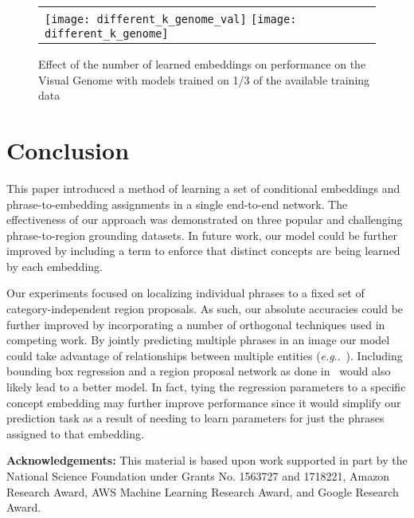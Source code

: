 \documentclass[runningheads]{llncs}
\makeatletter
\DeclareRobustCommand\onedot{\futurelet\@let@token\@onedot}
\def\@onedot{\ifx\@let@token.\else.\null\fi\xspace}
\def\eg{\emph{e.g}\onedot} \def\Eg{\emph{E.g}\onedot}
\def\etal{\emph{et al}\onedot}
\makeatother
\begin{document}
\begin{figure}[t]
\centering
\begin{tabular}{lr}
\texttt{[image: different\_k\_genome\_val]}
\texttt{[image: different\_k\_genome]}
\end{tabular}
\caption{Effect of the number of learned embeddings on performance on the Visual Genome with models trained on 1/3 of the available training data}
\label{fig:choice_of_K_genome}
\end{figure}%
\section{Conclusion}

This paper introduced a method of learning a set of conditional embeddings and phrase-to-embedding assignments in a single end-to-end network.  The effectiveness of our approach was demonstrated on three popular and challenging phrase-to-region grounding datasets.  In future work, our model could be further improved by including a term to enforce that distinct concepts are being learned by each embedding. 

Our experiments focused on localizing individual phrases to a fixed set of category-independent region proposals. As such, our absolute accuracies could be further improved by incorporating a number of orthogonal techniques used in competing work. By jointly predicting multiple phrases in an image our model could take advantage of relationships between multiple entities (\eg~\cite{plummerPLCLC2017,wang2016matching,ChenICMR2017,ChenICCV2017}).  Including bounding box regression and a region proposal network as done in~\cite{ChenICMR2017,ChenICCV2017} would also likely lead to a better model.  In fact, tying the regression parameters to a specific concept embedding may further improve performance since it would simplify our prediction task as a result of needing to learn parameters for just the phrases assigned to that embedding.
\smallskip

\noindent\textbf{Acknowledgements:} This material is based upon work supported in part by the National Science Foundation under Grants No. 1563727 and 1718221, Amazon Research Award, AWS Machine Learning Research Award, and Google Research Award. 



\end{document}
